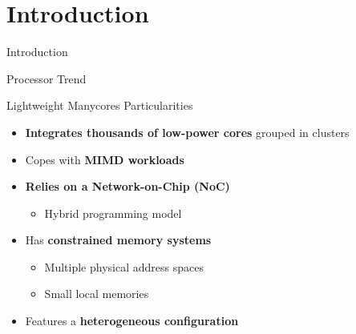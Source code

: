 \section{Introduction}


	\begin{frame}[fragile]{Introduction}
	\end{frame}

	\begin{frame}{Processor Trend}
		\begin{overprint}
		\end{overprint}
	\end{frame}

	\begin{frame}[fragile]{Lightweight Manycores Particularities}
		\begin{itemize}
			\item \textbf{Integrates thousands of low-power cores} grouped in clusters
			\item Copes with \textbf{MIMD workloads}
			\item \textbf{Relies on a Network-on-Chip (NoC)} %
			\begin{itemize}
				\item Hybrid programming model
			\end{itemize}
			\item Has \textbf{constrained memory systems}
			\begin{itemize}
				\item Multiple physical address spaces
				\item Small local memories
			\end{itemize}
			\item Features a \textbf{heterogeneous configuration}
		\end{itemize}
	\end{frame}


